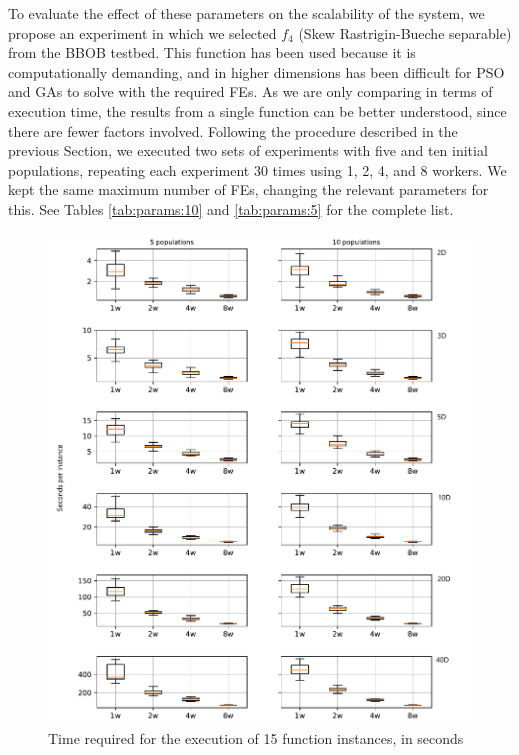 \documentclass[review]{elsarticle}
\begin{document}
To evaluate the effect of these parameters on the scalability of the system, we
propose  an experiment in which we selected $f_4$ (Skew Rastrigin-Bueche separable) from the
BBOB testbed. This function has been used because it is computationally demanding,
and in higher dimensions has been difficult for PSO \cite{el2009black} and GAs
\cite{nicolau2009application} to solve with the required FEs. As we
are only comparing in terms of execution time, the results from a single function
can be better understood, since there are fewer factors involved.
Following the procedure described in the previous Section, we executed 
two sets of experiments with five and ten initial populations,
repeating each experiment 30 times using  1, 2, 4, and 8 workers.  We kept the same 
maximum number of FEs, changing the relevant parameters for this. 
See Tables \ref{tab:params:10} and \ref{tab:params:5} 
for the complete list. 
%
\begin{figure}[h!tbp]
  \centering
  \includegraphics[width=\textwidth]{time_wrkr}
  \caption{Time required for the execution of 15 function
  instances, in seconds }
  \label{fig:spworker}
\end{figure}
\end{document}
